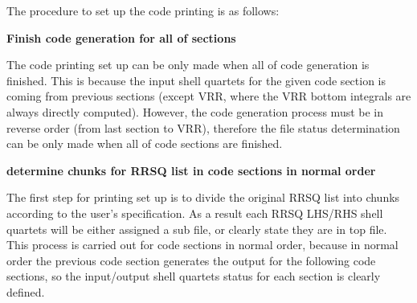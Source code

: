 The procedure to set up the code printing is as follows:

\begin{step}
\textbf{Finish code generation for all of sections}
 
The code printing set up can be only made when all of code generation is finished. 
This is because the input shell quartets for the given code section is coming 
from previous sections (except VRR, where the VRR bottom integrals are always directly
computed). However, the code generation process must be in reverse order (from last section
to VRR), therefore the file status determination can be only made when all of 
code sections are finished.
\end{step}

\begin{step}
\textbf{determine chunks for RRSQ list in code sections in normal order}
 
The first step for printing set up is to divide the original RRSQ list into chunks according
to the user's specification. As a result each RRSQ LHS/RHS shell quartets will be either 
assigned a sub file, or clearly state they are in top file. This process is carried out for 
code sections in normal order, because in normal order the previous code section generates 
the output for the following code sections, so the input/output shell quartets status for 
each section is clearly defined. 
\end{step}

